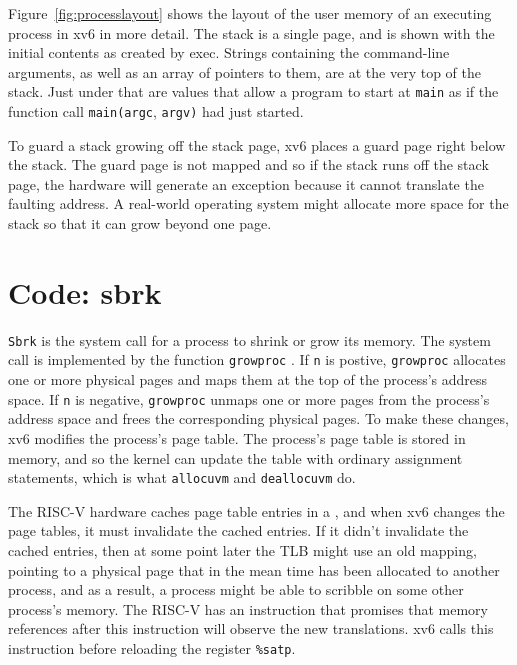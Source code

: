 Figure~\ref{fig:processlayout} shows the layout of the user memory of
an executing process in xv6 in more detail.  The stack is a single
page, and is shown with the initial contents as created by exec.
Strings containing the command-line arguments, as well as an array of
pointers to them, are at the very top of the stack.  Just under that
are values that allow a program to start at \lstinline{main} as if the
function call \lstinline{main(argc}, \lstinline{argv)} had just
started.

To guard a stack growing off the stack page, xv6 places a guard page
right below the stack.  The guard page is not mapped and so if the
stack runs off the stack page, the hardware will generate an exception
because it cannot translate the faulting address.  A real-world
operating system might allocate more space for the stack so that it
can grow beyond one page.

\section{Code: sbrk}

\lstinline{Sbrk}
is the system call for a process to shrink or grow its memory. The system
call is implemented by the function
\lstinline{growproc}
.
If
\lstinline{n}
is postive,
\lstinline{growproc}
allocates one or more physical pages and maps them at the top of the process's
address space.  If
\lstinline{n}
is negative,
\lstinline{growproc}
unmaps one or more pages from the process's address space and frees the corresponding
physical pages.
To make these changes,
xv6 modifies the process's page table.  The process's page table is stored in
memory, and so the kernel can update the table with ordinary assignment
statements, which is what
\lstinline{allocuvm}
and
\lstinline{deallocuvm}
do.

The RISC-V hardware caches page table entries in a
, and when xv6 changes
the page tables, it must invalidate the cached entries.  If it didn't
invalidate the cached entries, then at some point later the TLB might
use an old mapping, pointing to a physical page that in the mean time
has been allocated to another process, and as a result, a process
might be able to scribble on some other process's memory.  The RISC-V
has an instruction  that promises that memory
references after this instruction will observe the new translations.
xv6 calls this instruction before reloading the register
\texttt{\%satp}.

